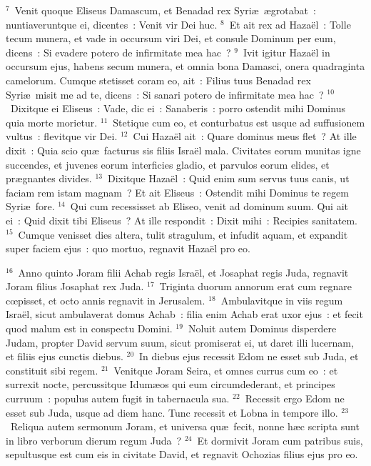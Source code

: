 ${}^{7}$~Venit quoque Eliseus Damascum, et Benadad rex Syri\ae\ \ae grotabat~: nuntiaveruntque ei, dicentes~: Venit vir Dei huc.
${}^{8}$~Et ait rex ad Haza\"el~: Tolle tecum munera, et vade in occursum viri Dei, et consule Dominum per eum, dicens~: Si evadere potero de infirmitate mea hac~?
${}^{9}$~Ivit igitur Haza\"el in occursum ejus, habens secum munera, et omnia bona Damasci, onera quadraginta camelorum. Cumque stetisset coram eo, ait~: Filius tuus Benadad rex Syri\ae\ misit me ad te, dicens~: Si sanari potero de infirmitate mea hac~?
${}^{10}$~Dixitque ei Eliseus~: Vade, dic ei~: Sanaberis~: porro ostendit mihi Dominus quia morte morietur.
${}^{11}$~Stetique cum eo, et conturbatus est usque ad suffusionem vultus~: flevitque vir Dei.
${}^{12}$~Cui Haza\"el ait~: Quare dominus meus flet~? At ille dixit~: Quia scio qu\ae\ facturus sis filiis Isra\"el mala. Civitates eorum munitas igne succendes, et juvenes eorum interficies gladio, et parvulos eorum elides, et pr\ae gnantes divides.
${}^{13}$~Dixitque Haza\"el~: Quid enim sum servus tuus canis, ut faciam rem istam magnam~? Et ait Eliseus~: Ostendit mihi Dominus te regem Syri\ae\ fore.
${}^{14}$~Qui cum recessisset ab Eliseo, venit ad dominum suum. Qui ait ei~: Quid dixit tibi Eliseus~? At ille respondit~: Dixit mihi~: Recipies sanitatem.
${}^{15}$~Cumque venisset dies altera, tulit stragulum, et infudit aquam, et expandit super faciem ejus~: quo mortuo, regnavit Haza\"el pro eo.


${}^{16}$~Anno quinto Joram filii Achab regis Isra\"el, et Josaphat regis Juda, regnavit Joram filius Josaphat rex Juda.
${}^{17}$~Triginta duorum annorum erat cum regnare cœpisset, et octo annis regnavit in Jerusalem.
${}^{18}$~Ambulavitque in viis regum Isra\"el, sicut ambulaverat domus Achab~: filia enim Achab erat uxor ejus~: et fecit quod malum est in conspectu Domini.
${}^{19}$~Noluit autem Dominus disperdere Judam, propter David servum suum, sicut promiserat ei, ut daret illi lucernam, et filiis ejus cunctis diebus.
${}^{20}$~In diebus ejus recessit Edom ne esset sub Juda, et constituit sibi regem.
${}^{21}$~Venitque Joram Seira, et omnes currus cum eo~: et surrexit nocte, percussitque Idum\ae os qui eum circumdederant, et principes curruum~: populus autem fugit in tabernacula sua.
${}^{22}$~Recessit ergo Edom ne esset sub Juda, usque ad diem hanc. Tunc recessit et Lobna in tempore illo.
${}^{23}$~Reliqua autem sermonum Joram, et universa qu\ae\ fecit, nonne h\ae c scripta sunt in libro verborum dierum regum Juda~?
${}^{24}$~Et dormivit Joram cum patribus suis, sepultusque est cum eis in civitate David, et regnavit Ochozias filius ejus pro eo.


